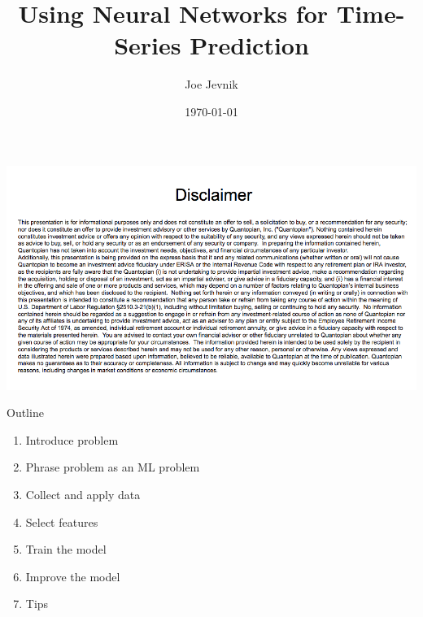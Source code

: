 \documentclass[table]{beamer}
\title{Using Neural Networks for Time-Series Prediction}
\date{\today}
\author{Joe Jevnik}
\institute{QuanTech NYC}
\begin{document}
\maketitle

\begin{frame}
  \begin{center}
    \includegraphics[width=1.00\textwidth]{images/disclaimer.png}
  \end{center}
\end{frame}

\begin{frame}{Outline}
  \begin{enumerate}
  \item Introduce problem
  \item Phrase problem as an ML problem
  \item Collect and apply data
  \item Select features
  \item Train the model
  \item Improve the model
  \item Tips
  \end{enumerate}
\end{frame}
\end{document}
